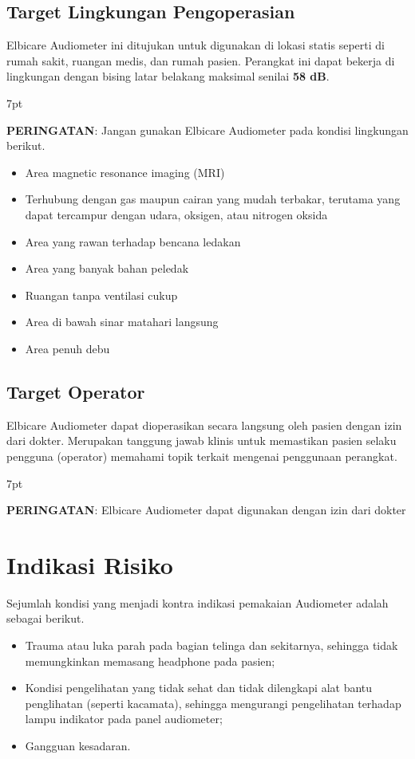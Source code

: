 \documentclass[11pt,a4paper,twoside,onecolumn]{book}
\newenvironment{formalred}{%
	\def\FrameCommand{%
		\hspace{1pt}%
		{\color{red}\vrule width 2pt}%
		{\color{formalshade}\vrule width 4pt}%
		\colorbox{formalshade}%
	}%
	\MakeFramed{\advance\hsize-\width\FrameRestore}%
	\noindent\hspace{-4.55pt}%
	\begin{adjustwidth}{}{7pt}%
		\vspace{2pt}\vspace{2pt}%
	}
	{%
		\vspace{2pt}\end{adjustwidth}\endMakeFramed%
}
\begin{document}
			\subsection{Target Lingkungan Pengoperasian}
			Elbicare Audiometer ini ditujukan untuk digunakan di lokasi statis seperti di rumah sakit, ruangan medis, dan rumah pasien. Perangkat ini dapat bekerja di lingkungan dengan bising latar belakang maksimal senilai \textbf{58 dB}. 
			
			\begin{formalred}
				\raisebox{0.125ex}{\resizebox{!}{2ex}{\danger}} \textbf{PERINGATAN}: 
				Jangan gunakan Elbicare Audiometer pada kondisi lingkungan berikut.
				\begin{itemize}
					\item Area magnetic resonance imaging (MRI)
					\item Terhubung dengan gas maupun cairan yang mudah terbakar, terutama yang dapat tercampur dengan udara, oksigen, atau nitrogen oksida
					\item Area yang rawan terhadap bencana ledakan
					\item Area yang banyak bahan peledak
					\item Ruangan tanpa ventilasi cukup
					\item Area di bawah sinar matahari langsung
					\item Area penuh debu
				\end{itemize}
				
			\end{formalred}
			
			\subsection{Target Operator}
			Elbicare Audiometer dapat dioperasikan secara langsung oleh pasien dengan izin dari dokter. Merupakan tanggung jawab klinis untuk memastikan pasien selaku pengguna (operator) memahami topik terkait mengenai penggunaan perangkat.
			\begin{formalred}
				\raisebox{0.125ex}{\resizebox{!}{2ex}{\danger}} \textbf{PERINGATAN}: 
				Elbicare Audiometer dapat digunakan dengan izin dari dokter
			\end{formalred}	
		
		\section{Indikasi Risiko}
		Sejumlah kondisi yang menjadi kontra indikasi pemakaian Audiometer adalah sebagai berikut.
		\begin{itemize}
			\item Trauma atau luka parah pada bagian telinga dan sekitarnya, sehingga tidak memungkinkan memasang headphone pada pasien;
			\item Kondisi pengelihatan yang tidak sehat dan tidak dilengkapi alat bantu penglihatan (seperti kacamata), sehingga mengurangi pengelihatan terhadap lampu indikator pada panel audiometer;
			\item Gangguan kesadaran.
		\end{itemize}
	
\end{document}
